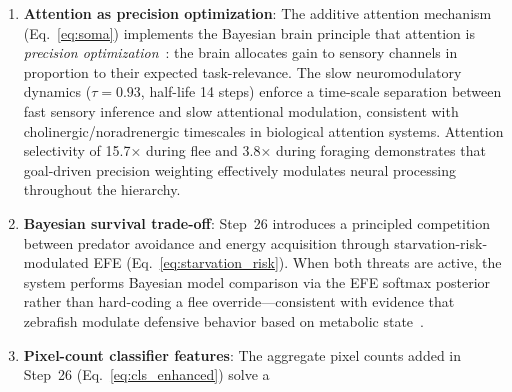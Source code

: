 \documentclass[11pt,a4paper]{article}
\begin{document}
\begin{enumerate}[nosep]
    two-compartment neurons featuring distinct somatic (bottom-up) and
    apical (top-down) compartments.  The apical--somatic mismatch
    provides a principled prediction error signal that drives both
    free energy computation and feedback weight learning.
    Crucially, the feedback learning rule (Eq.~\ref{eq:fe_gradient})
    is \emph{derived from the free energy gradient}
    $\partial F / \partial \mathbf{W}_\text{FB}$, operating every
    timestep independently of reward---implementing true predictive
    coding~\cite{rao1999} rather than reward-gated prediction.
    The separation between reward-modulated feedforward learning
    (recognition model) and reward-independent feedback learning
    (generative model) reflects the fundamental distinction in
    predictive coding between perceptual inference and perceptual
    learning~\cite{bogacz2017}.
    Homeostatic gain control (Eq.~\ref{eq:gain_control}) prevents
    cascading activity growth, and cross-episode PE convergence ($-27\%$
    over three episodes) confirms the system learns environmental
    regularities.
  \item \textbf{Attention as precision optimization}: The additive
    attention mechanism (Eq.~\ref{eq:soma}) implements the Bayesian brain
    principle that attention is \emph{precision
    optimization}~\cite{feldman2010}: the brain allocates gain to
    sensory channels in proportion to their expected task-relevance.
    The slow neuromodulatory dynamics ($\tau = 0.93$, half-life 14 steps)
    enforce a time-scale separation between fast sensory inference and
    slow attentional modulation, consistent with cholinergic/noradrenergic
    timescales in biological attention systems.
    Attention selectivity of 15.7$\times$ during flee and 3.8$\times$
    during foraging demonstrates that goal-driven precision weighting
    effectively modulates neural processing throughout the hierarchy.
  \item \textbf{Bayesian survival trade-off}: Step~26 introduces a
    principled competition between predator avoidance and energy
    acquisition through starvation-risk-modulated EFE
    (Eq.~\ref{eq:starvation_risk}).
    When both threats are active, the system performs Bayesian model
    comparison via the EFE softmax posterior rather than hard-coding
    a flee override---consistent with evidence that zebrafish modulate
    defensive behavior based on metabolic state~\cite{dunn2016}.
  \item \textbf{Pixel-count classifier features}: The aggregate pixel
    counts added in Step~26 (Eq.~\ref{eq:cls_enhanced}) solve a

\end{enumerate}
\end{document}
